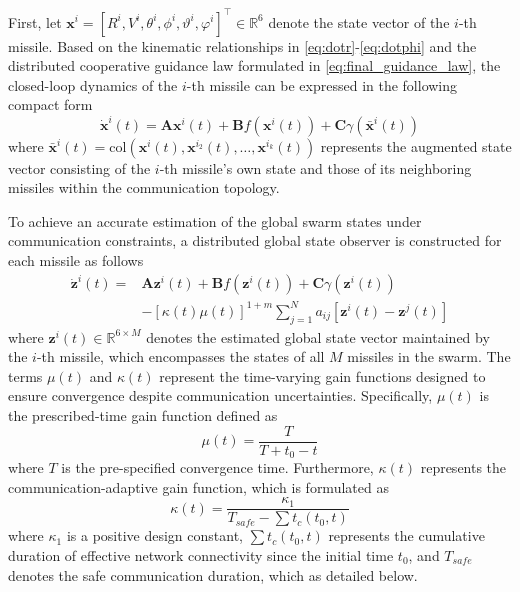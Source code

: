 \documentclass[lettersize,journal]{IEEEtran}
\begin{document}
First, let $\mathbf{x}^i = [R^i, V^i, \theta^i, \phi^i, \vartheta^i, \varphi^i]^\top \in \mathbb{R}^6$ denote the state vector of the $i$-th missile. Based on the kinematic relationships in \eqref{eq:dotr}-\eqref{eq:dotphi} and the distributed cooperative guidance law formulated in \eqref{eq:final_guidance_law}, the closed-loop dynamics of the $i$-th missile can be expressed in the following compact form
\begin{equation}
	\dot{\mathbf{x}}^i(t) = \mathbf{A}\mathbf{x}^i(t) + \mathbf{B}f(\mathbf{x}^i(t)) + \mathbf{C}\gamma(\bar{\mathbf{x}}^i(t))
\end{equation}
where $\bar{\mathbf{x}}^i(t) = \text{col}(\mathbf{x}^i(t), \mathbf{x}^{i_2}(t), \dots, \mathbf{x}^{i_k}(t))$ represents the augmented state vector consisting of the $i$-th missile's own state and those of its neighboring missiles within the communication topology. 

To achieve an accurate estimation of the global swarm states under communication constraints, a distributed global state observer is constructed for each missile as follows
\begin{equation}
	\label{eq:observer_structure}
	\begin{aligned}
		\dot{\mathbf{z}}^i(t) = & \mathbf{A}\mathbf{z}^i(t) + \mathbf{B}f(\mathbf{z}^i(t)) + \mathbf{C}\gamma(\mathbf{z}^i(t)) \\
		& - [\kappa(t)\mu(t)]^{1+m} \sum_{j=1}^N a_{ij} [\mathbf{z}^i(t) - \mathbf{z}^j(t)]
	\end{aligned}
\end{equation}
where $\mathbf{z}^i(t) \in \mathbb{R}^{6 \times M}$ denotes the estimated global state vector maintained by the $i$-th missile, which encompasses the states of all $M$ missiles in the swarm. The terms $\mu(t)$ and $\kappa(t)$ represent the time-varying gain functions designed to ensure convergence despite communication uncertainties. Specifically, $\mu(t)$ is the prescribed-time gain function defined as
\begin{equation}
	\mu(t) = \frac{T}{T + t_0 - t}
\end{equation}
where $T$ is the pre-specified convergence time. Furthermore, $\kappa(t)$ represents the communication-adaptive gain function, which is formulated as
\begin{equation}
	\kappa(t) = \frac{\kappa_1}{T_{safe} - \sum t_c(t_0, t)}
\end{equation}
where $\kappa_1$ is a positive design constant, $\sum t_c(t_0, t)$ represents the cumulative duration of effective network connectivity since the initial time $t_0$, and $T_{safe}$ denotes the safe communication duration, which as detailed below.
\end{document}
